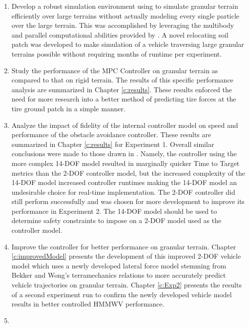 \documentclass[12pt,onecolumn]{report}
\newcommand{\CHRONO}{{\sffamily{{Chrono}}}}
\begin{document}
\begin{enumerate}
\item
Develop a robust simulation environment using {\CHRONO} to simulate granular terrain efficiently over large terrains without actually modeling every single particle over the large terrain. This was accomplished by leveraging the multibody and parallel computational abilities provided by {\CHRONO}. A novel relocating soil patch was developed to make simulation of a vehicle traversing large granular terrains possible without requiring months of runtime per experiment. 
\item
Study the performance of the MPC Controller on granular terrain as compared to that on rigid terrain. The results of this specific performance analysis are summarized in Chapter \ref{c:results}. These results enforced the need for more research into a better method of predicting tire forces at the tire ground patch in a simple manner. 
\item
Analyze the impact of fidelity of the internal controller model on speed and performance of the obstacle avoidance controller. These results are summarized in Chapter \ref{c:results} for Experiment 1. Overall similar conclusions were made to those drawn in \cite{ModelFidelity2016}. Namely, the controller using the more complex 14-DOF model resulted in marginally quicker Time to Target metrics than the 2-DOF controller model, but the increased complexity of the 14-DOF model increased controller runtimes making the 14-DOF model an undesirable choice for real-time implementation. The 2-DOF controller did still perform successfully and was chosen for more development to  improve its performance in Experiment 2. The 14-DOF model should be used to determine safety constraints to impose on a 2-DOF model used as the controller model. 
\item
Improve the controller for better performance on granular terrain. Chapter \ref{c:improvedModel} presents the development of this improved 2-DOF vehicle model which uses a newly developed lateral force model stemming from Bekker and Wong's terramechanics relations to more accurately predict vehicle trajectories on granular terrain. Chapter \ref{c:Exp2} presents the results of a second experiment run to confirm the newly developed vehicle model results in better controlled HMMWV performance.  
\item

\end{enumerate}
\end{document}
